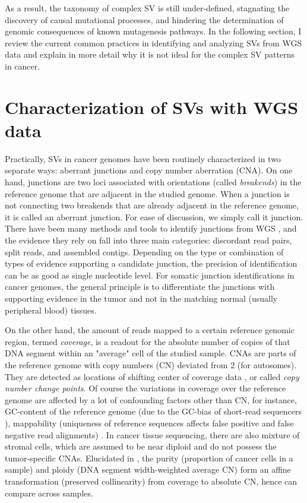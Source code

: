 \documentclass[phd,tocprelim]{cornell}
\begin{document}
As a result, the taxonomy of complex SV is still under-defined, stagnating the discovery of causal mutational processes, and hindering the determination of genomic consequences of known mutagenesis pathways. In the following section, I review the current common practices in identifying and analyzing SVs from WGS data and explain in more detail why it is not ideal for the complex SV patterns in cancer.

\section{Characterization of SVs with WGS data}
Practically, SVs in cancer genomes have been routinely characterized in two separate ways: aberrant junctions and copy number aberration (CNA). On one hand, junctions are two loci associated with orientations (called \textit{breakends}) in the reference genome that are adjacent in the studied genome. When a junction is not connecting two breakends that are already adjacent in the reference genome, it is called an aberrant junction. For ease of discussion, we simply call it junction. There have been many methods and tools to identify junctions from WGS \cite{wala2018,Cameron2017-pz,Rausch2012-ly,Wang2011-lg,Layer2014-xq}, and the evidence they rely on fall into three main categories: discordant read pairs, split reads, and assembled contigs. Depending on the type or combination of types of evidence supporting a candidate junction, the precision of identification can be as good as single nucleotide level. For somatic junction identifications in cancer genomes, the general principle is to differentiate the junctions with supporting evidence in the tumor and not in the matching normal (usually peripheral blood) tissues.

On the other hand, the amount of reads mapped to a certain reference genomic region, termed \textit{coverage}, is a readout for the absolute number of copies of that DNA segment within an "average" cell of the studied sample. CNAs are parts of the reference genome with copy numbers (CN) deviated from 2 (for autosomes). They are detected as locations of shifting center of coverage data \cite{Ha2014-ai,Xi2011-oa,Carter2012-xo,Favero2015-hj,Van_Loo2010-ed,Shen2016-fi}, or called \textit{copy number change points}. Of course the variations in coverage over the reference genome are affected by a lot of confounding factors other than CN, for instance, GC-content of the reference genome (due to the GC-bias of short-read sequencers \cite{Benjamini_Speed_2012}), mappability (uniqueness of reference sequences affects false positive and false negative read alignments) \cite{Lee_Schatz_2012}. In cancer tissue sequencing, there are also mixture of stromal cells, which are assumed to be near diploid and do not possess the tumor-specific CNAs. Elucidated in \cite{Carter2012-xo}, the purity (proportion of cancer cells in a sample) and ploidy (DNA segment width-weighted average CN) form an affine transformation (preserved collinearity) from coverage to absolute CN, hence can compare across samples.
\end{document}
